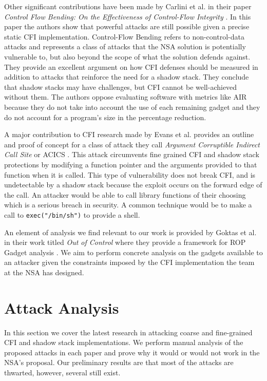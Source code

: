 \documentclass[conference,compsoc]{IEEEtran}
\begin{document}
Other significant contributions have been made by Carlini et al. in their paper \emph{Control Flow Bending: On the Effectiveness of Control-Flow Integrity} \cite{carlini}. In this paper the authors show that powerful attacks are still possible given a precise static CFI implementation. Control-Flow Bending refers to non-control-data attacks and represents a class of attacks that the NSA solution is potentially vulnerable to, but also beyond the scope of what the solution defends against. They provide an excellent argument on how CFI defenses should be measured in addition to attacks that reinforce the need for a shadow stack. They conclude that shadow stacks may have challenges, but CFI cannot be well-achieved without them. The authors oppose evaluating software with metrics like AIR \cite{Zhang:2013:COTS} because they do not take into account the use of each remaining gadget and they do not account for a program's size in the percentage reduction.

A major contribution to CFI research made by Evans et al. provides an outline and proof of concept for a class of attack they call \emph{Argument Corruptible Indirect Call Site} or ACICS \cite{evans}. This attack circumvents fine grained CFI and shadow stack protections by modifying a function pointer and the arguments provided to that function when it is called. This type of vulnerability does not break CFI, and is undetectable by a shadow stack because the exploit occurs on the forward edge of the call. An attacker would be able to call library functions of their choosing which is a serious breach in security. A common technique would be to make a call to \verb|exec("/bin/sh")| to provide a shell.

An element of analysis we find relevant to our work is provided by Goktas et al. in their work titled \emph{Out of Control} where they provide a framework for ROP Gadget analysis \cite{goktas}. We aim to perform concrete analysis on the gadgets available to an attacker given the constraints imposed by the CFI implementation the team at the NSA has designed. 

\section{Attack Analysis} \label{sec:attacks}

In this section we cover the latest research in attacking coarse and fine-grained CFI and shadow stack implementations. We perform manual analysis of the proposed attacks in each paper and prove why it would or would not work in the NSA's proposal. Our preliminary results are that most of the attacks are thwarted, however, several still exist.
\end{document}

